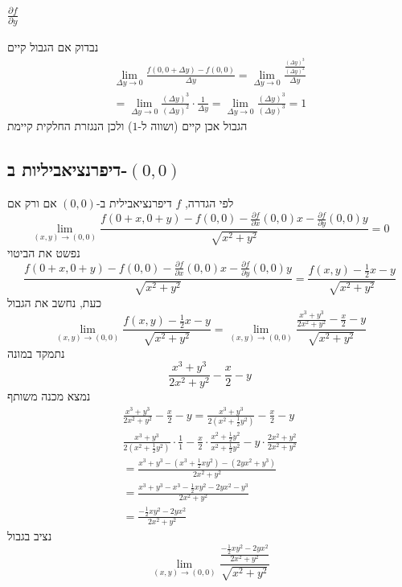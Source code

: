 \documentclass[12pt, titlepage]{article}
\newcommand{\pard}[2][f]{\frac{\partial #1}{\partial #2}}
\begin{document}
\subsubsection*{$\pard{y}$}
נבדוק אם הגבול קיים
\begin{gather*}
    \lim_{\Delta y \to 0} \frac{f\left(0,0+\Delta y\right)-f\left(0,0\right)}{\Delta y} = \lim_{\Delta y\to 0} \frac{\frac{\left(\Delta y\right)^3}{\left(\Delta y\right)^2}}{\Delta y} \\=\lim_{\Delta y\to0} \frac{\left(\Delta y\right)^3}{\left(\Delta y\right)^2} \cdot \frac{1}{\Delta y} =\lim_{\Delta y \to 0} \frac{\left(\Delta y\right)^3}{\left(\Delta y\right)^3} = 1
\end{gather*}
הגבול אכן קיים (ושווה ל-$1$) ולכן הנגזרת החלקית קיימת
\subsection*{דיפרנציאביליות ב-$\left(0,0\right)$}
לפי הגדרה, $f$ דיפרנציאבילית ב-$\left(0,0\right)$ אם ורק אם
\[
    \lim_{\left(x,y\right) \to \left(0,0\right)} \frac{f\left(0+x,0+y\right)-f\left(0,0\right)-\pard{x}\left(0,0\right)x-\pard{y}\left(0,0\right)y}{\sqrt{x^2+y^2}} =0
\]
נפשט את הביטוי
\[
 \frac{f\left(0+x,0+y\right)-f\left(0,0\right)-\pard{x}\left(0,0\right)x-\pard{y}\left(0,0\right)y}{\sqrt{x^2+y^2}} = \frac{f\left(x,y\right) - \frac{1}{2}x - y}{\sqrt{x^2+y^2}}
\]
כעת, נחשב את הגבול
\[
    \lim_{\left(x,y\right)\to \left(0,0\right)} \frac{f\left(x,y\right) -\frac{1}{2}x - y}{\sqrt{x^2+y^2}}  = \lim_{\left(x,y\right)\to \left(0,0\right)} \frac{\frac{x^3+y^3}{2x^2+y^2} -\frac{x}{2} - y}{\sqrt{x^2+y^2}} 
\]
נתמקד במונה
\[
\frac{x^3+y^3}{2x^2+y^2} -\frac{x}{2} - y
\]
נמצא מכנה משותף
\begin{gather*}
    \frac{x^3+y^3}{2x^2+y^2} -\frac{x}{2} - y =\frac{x^3+y^3}{2\left(x^2+\frac{1}{2}y^2\right)} -\frac{x}{2} -y \\
    \frac{x^3+y^3}{2\left(x^2+\frac{1}{2}y^2\right)} \cdot \frac{1}{1} -\frac{x}{2} \cdot \frac{x^2+\frac{1}{2}y^2}{x^2+\frac{1}{2}y^2} -y \cdot \frac{2x^2 + y^2}{2x^2 + y^2}\\
    = \frac{x^3+y^3-\left(x^3+\frac{1}{2}xy^2\right)-\left(2yx^2 + y^3\right)}{2x^2+y^2} \\
    = \frac{x^3+y^3-x^3-\frac{1}{2}xy^2-2yx^2 - y^3}{2x^2+y^2} \\
    = \frac{-\frac{1}{2}xy^2 - 2yx^2}{2x^2+y^2}
\end{gather*}
נציב בגבול
\[
    \lim_{\left(x,y\right) \to \left(0,0\right)} \frac{\frac{-\frac{1}{2}xy^2 - 2yx^2}{2x^2+y^2}}{\sqrt{x^2+y^2}}
\]
\end{document}
